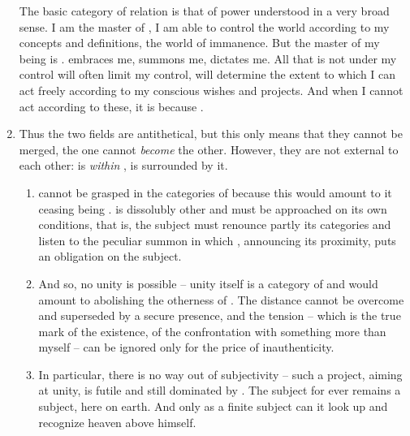 \begin{enumerate}
The basic category of relation is that of power understood in a very broad sense. I am the master of
, I am able to control the world according to my concepts and definitions, the world of
immanence. But the master of my being is .  embraces me, summons me, dictates me.
All that is not under my control will often limit my control, will determine the extent to which
I can act freely according to my conscious wishes and projects. And when I cannot act according to 
these, it is because .
\item
Thus the two fields are antithetical, but this only means that they cannot be merged, the one cannot
{\em become} the other. However, they  are not external to each other:  is {\em within}
, is surrounded by it. 
 \begin{enumerate}\MyLPar
 \item
{} cannot be grasped in the categories of  because this would amount to it ceasing being
.  is dissolubly other and must be approached on its own conditions, that is, 
the subject must renounce partly
its categories and listen to the peculiar summon in which , announcing its proximity, 
puts an obligation on the subject.
 \item
And so, no unity is possible -- unity itself is a category of  and would amount to abolishing
the otherness of . The distance cannot be overcome and superseded by a secure presence,
 and the tension -- which is the true mark of the existence, of the confrontation with 
something more than myself -- can be ignored only for the price of inauthenticity.
 \item
In particular, there is no way out of subjectivity -- such a project, aiming at unity, is futile and 
still dominated by . The subject for ever remains a subject, here on earth. And only as a
finite subject can it look up and recognize heaven above himself.
 \end{enumerate}
\end{enumerate}

